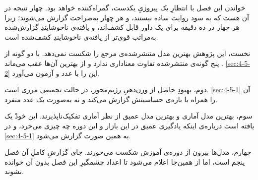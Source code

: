 خواندن این فصل با انتظارِ یک پیروزیِ یکدست، گمراه‌کننده خواهد بود. چهار نتیجه در آن
هست که به سود روایت ساده نیستند، و هر چهار به‌صراحت گزارش می‌شوند؛ زیرا هر چهار در
ده دقیقه برای یک داور قابل کشف‌اند، و یافته‌ی ناخوشایندِ گزارش‌شده به‌مراتب قوی‌تر از
یافته‌ی ناخوشایندِ کشف‌شده است.

نخست، این پژوهش بهترین مدل منتشرشده‌ی مرجع را شکست نمی‌دهد. با دو گونه از پنج گونه‌ی
منتشرشده تفاوت معناداری ندارد و از بهترین آن‌ها عقب می‌ماند
\cite{lago_forecasting_2021}. \cref{sec:4-5-2} این را با عدد و آزمون می‌آورد.

دوم، بهبودِ حاصل از وزن‌دهیِ رژیم‌محور، در حالت تجمیعی مرزی است. \cref{sec:4-5-1} آن را
همراه با بازه‌ی حساسیتش گزارش می‌کند و نه به‌صورت یک عدد منفرد.

سوم، بهترین مدل آماری و بهترین مدل عمیق از نظر آماری تفکیک‌ناپذیرند. این خودْ یک
یافته است درباره‌ی اینکه یادگیری عمیق در این بازار و این دوره چه چیزی می‌خرد، و در \cref{sec:4-5-1} به همین صورت گزارش می‌شود.

چهارم، مدل‌ها بیرون از دوره‌ی آموزش شکست می‌خورند. جای گزارشِ کاملِ آن فصل پنجم است، اما
از همین‌جا اعلام می‌شود تا اعداد چشمگیرِ این فصل بدون آن خوانده نشوند.
